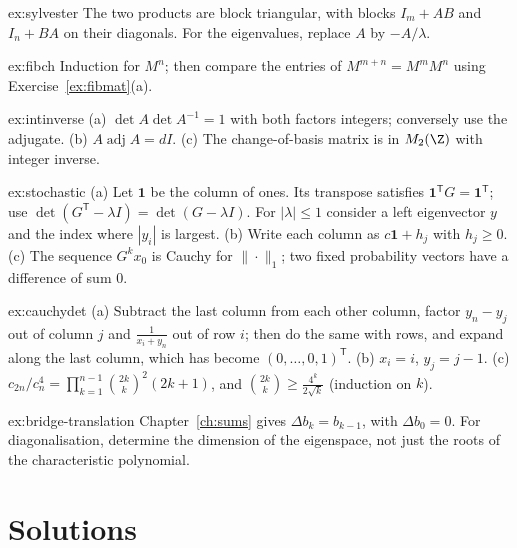 \begin{hint}{ex:sylvester}
The two products are block triangular, with blocks $I_m+AB$ and $I_n+BA$ on their diagonals. For the eigenvalues, replace $A$ by $-A/\lambda$.
\end{hint}
\begin{hint}{ex:fibch}
Induction for $M^n$; then compare the entries of $M^{m+n}=M^mM^n$ using Exercise~\ref{ex:fibmat}(a).
\end{hint}
\begin{hint}{ex:intinverse}
(a) $\det A\det A^{-1}=1$ with both factors integers; conversely use the adjugate. (b) $A\operatorname{adj}A=dI$. (c) The change-of-basis matrix is in $M_2(\Z)$ with integer inverse.
\end{hint}
\begin{hint}{ex:stochastic}
(a) Let $\mathbf 1$ be the column of ones. Its transpose satisfies $\mathbf 1^{\mathsf T}G=\mathbf 1^{\mathsf T}$; use $\det(G^{\mathsf T}-\lambda I)=\det(G-\lambda I)$. For $|\lambda|\le1$ consider a left eigenvector $y$ and the index where $|y_i|$ is largest. (b) Write each column as $c\mathbf 1+h_j$ with $h_j\ge0$. (c) The sequence $G^kx_0$ is Cauchy for $\|\cdot\|_1$; two fixed probability vectors have a difference of sum $0$.
\end{hint}
\begin{hint}{ex:cauchydet}
(a) Subtract the last column from each other column, factor $y_n-y_j$ out of column $j$ and $\frac1{x_i+y_n}$ out of row $i$; then do the same with rows, and expand along the last column, which has become $(0,\dots,0,1)^{\mathsf T}$. (b) $x_i=i$, $y_j=j-1$. (c) $c_{2n}/c_n^4=\prod_{k=1}^{n-1}\binom{2k}k^2(2k+1)$, and $\binom{2k}k\ge\frac{4^k}{2\sqrt k}$ (induction on $k$).
\end{hint}

\begin{hint}{ex:bridge-translation}
Chapter~\ref{ch:sums} gives $\Delta b_k=b_{k-1}$, with $\Delta b_0=0$. For diagonalisation, determine the dimension of the eigenspace, not just the roots of the characteristic polynomial.
\end{hint}

\section{Solutions}

